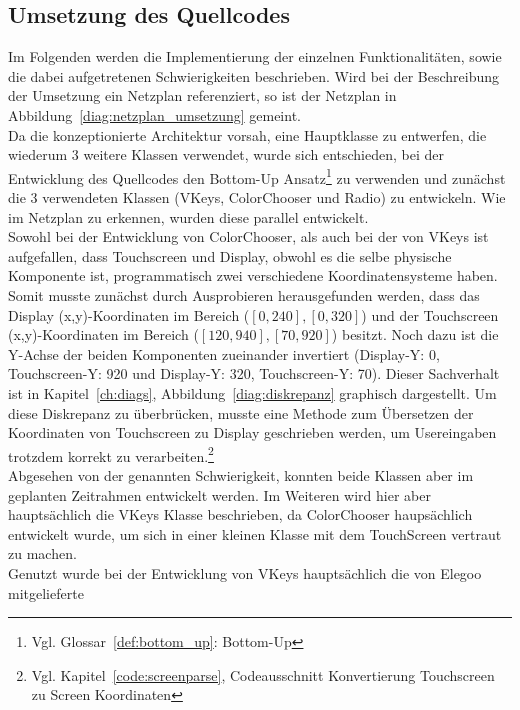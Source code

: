 \documentclass[a4paper, 11pt]{scrartcl}
\begin{document}
\subsection{Umsetzung des Quellcodes}
Im Folgenden werden die Implementierung der einzelnen Funktionalitäten, sowie die dabei aufgetretenen
Schwierigkeiten beschrieben. Wird bei der Beschreibung der Umsetzung ein Netzplan referenziert, so ist der Netzplan in Abbildung~\ref{diag:netzplan_umsetzung} gemeint.
\\
Da die konzeptionierte Architektur vorsah, eine Hauptklasse zu entwerfen, die wiederum 3 weitere Klassen verwendet, wurde sich entschieden, bei der Entwicklung des
Quellcodes den Bottom-Up Ansatz\footnote{Vgl. Glossar~\ref{def:bottom_up}: Bottom-Up} zu verwenden und zunächst die 3 verwendeten Klassen (\glqq VKeys\grqq{}, \glqq ColorChooser\grqq{} und \glqq Radio\grqq{})
zu entwickeln. Wie im Netzplan zu erkennen, wurden diese parallel entwickelt.
\\
Sowohl bei der Entwicklung von \glqq ColorChooser\grqq{}, als auch bei der von \glqq VKeys\grqq{} ist aufgefallen, dass Touchscreen und Display, obwohl es die selbe physische Komponente ist, programmatisch zwei 
verschiedene Koordinatensysteme haben. Somit musste zunächst durch Ausprobieren herausgefunden werden, dass das Display (x,y)-Koordinaten im Bereich
($\left[\text{0},\text{240}\right],\left[\text{0},\text{320}\right]$) und der Touchscreen (x,y)-Koordinaten im Bereich 
($\left[\text{120},\text{940}\right],\left[\text{70},\text{920}\right]$) besitzt. Noch dazu ist die Y-Achse der beiden Komponenten zueinander invertiert
(Display-Y: 0, Touchscreen-Y: 920 und Display-Y: 320, Touchscreen-Y: 70). Dieser Sachverhalt ist in Kapitel~\ref{ch:diags}, Abbildung~\ref{diag:diskrepanz}
graphisch dargestellt. Um diese Diskrepanz zu überbrücken, musste eine Methode zum Übersetzen der Koordinaten von Touchscreen zu Display geschrieben werden, um 
Usereingaben trotzdem korrekt zu verarbeiten.\footnote{Vgl. Kapitel~\ref{code:screenparse}, Codeausschnitt \glqq Konvertierung Touchscreen zu Screen Koordinaten\grqq{}}
\\
Abgesehen von der genannten Schwierigkeit, konnten beide Klassen aber im geplanten Zeitrahmen entwickelt werden. Im Weiteren wird hier aber hauptsächlich die VKeys
Klasse beschrieben, da \glqq ColorChooser\grqq{} haupsächlich entwickelt wurde, um sich in einer kleinen Klasse mit dem TouchScreen vertraut zu machen. 
\\
Genutzt wurde bei der Entwicklung von \glqq VKeys\grqq{} hauptsächlich die von Elegoo mitgelieferte
\end{document}
